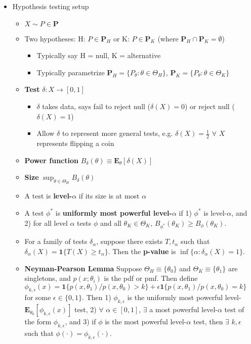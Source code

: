 \documentclass[12pt,english]{article}
\begin{document}
\begin{itemize}
	\item Hypothesis testing setup
	\begin{itemize}
		\item $X \sim P \in \mathbf{P}$
		\item Two hypotheses: H: $P \in \mathbf{P}_{H}$ or K: $P \in \mathbf{P}_{K}$ (where $\mathbf{P}_{H} \cap \mathbf{P}_{K} = \emptyset$)
		\begin{itemize}
			\item Typically say H = null, K = alternative
			\item Typically parametrize $\mathbf{P}_{H} = \{ P_{\theta} : \theta \in \Theta_{H} \}$, $\mathbf{P}_{K} = \{ P_{\theta} : \theta \in \Theta_{K} \}$
		\end{itemize}
		\item \textbf{Test} $\delta : X \to [0, 1]$
		\begin{itemize}
			\item $\delta$ takes data, says fail to reject null ($\delta(X) = 0$) or reject null ($\delta(X) = 1$)
			\item Allow $\delta$ to represent more general tests, e.g. $\delta(X) = \frac{1}{2}$ $\forall$ $X$ represents flipping a coin
		\end{itemize}
		\item \textbf{Power function} $B_{\delta}(\theta) \equiv \mathbf{E}_{\theta}[\delta(X)]$
		\item \textbf{Size} $\sup_{\theta \in \Theta_{H}} B_{\delta}(\theta)$
		\item A test is \textbf{level-$\alpha$} if its size is at most $\alpha$
		\item A test $\phi^{*}$ is \textbf{uniformly most powerful level-$\alpha$} if 1) $\phi^{*}$ is level-$\alpha$, and 2) for all level $\alpha$ tests $\phi$ and all $\theta_{K} \in \Theta_{K}$, $B_{\phi^{*}}(\theta_{K}) \geq B_{\phi}(\theta_{K})$.
		\item For a family of tests $\delta_{\alpha}$, suppose there exists $T, t_{\alpha}$ such that $\delta_{\alpha}(X) = \mathbf{1}\{ T(X) \geq t_{\alpha} \}$. Then the \textbf{p-value} is $\inf \{ \alpha : \delta_{\alpha}(X) = 1 \}$.
		\item \textbf{Neyman-Pearson Lemma} Suppose $\Theta_{H} \equiv \{ \theta_{0} \}$ and $\Theta_{K} \equiv \{ \theta_{1} \}$ are singletons, and $p(x; \theta_{i})$ is the pdf or pmf. Then define $\phi_{k,\epsilon}(x) = \mathbf{1} \{ p(x, \theta_{1}) / p(x, \theta_{0}) > k \} + \epsilon \mathbf{1} \{ p(x, \theta_{1}) / p(x, \theta_{0}) = k \}$ for some $\epsilon \in \{ 0, 1\}$. Then 1) $\phi_{k, \epsilon}$ is the uniformly most powerful level-$\mathbf{E}_{\theta_{0}}[\phi_{k, \epsilon}(x)]$ test, 2) $\forall$ $\alpha \in [0, 1]$, $\exists$ a most powerful level-$\alpha$ test of the form $\phi_{k, \epsilon}$, and 3) if $\phi$ is the most powerful level-$\alpha$ test, then $\exists$ $k, \epsilon$ such that $\phi(\cdot) = \phi_{k, \epsilon}(\cdot)$.

\end{itemize}
\end{itemize}
\end{document}
